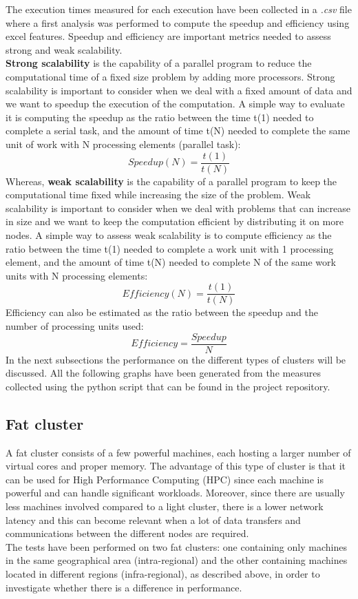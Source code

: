 \documentclass[final,5p,times,twocolumn,authoryear]{elsarticle}
\begin{document}
The execution times measured for each execution have been collected in a \emph{.csv} file where a first analysis was performed to compute the speedup and efficiency using excel features. Speedup and efficiency are important metrics needed to assess strong and weak scalability. \\
\textbf{Strong scalability} is the capability of a parallel program to reduce the computational time of a fixed size problem by adding more processors. Strong scalability is important to consider when we deal with a fixed amount of data and we want to speedup the execution of the computation. A simple way to evaluate it is computing the speedup as the ratio between the time t(1) needed to complete a serial task, and the amount of time t(N) needed to complete the same unit of work with N processing elements (parallel task)\cite{hpc scaling}:
$$ Speedup(N) = \frac{t(1)}{t(N)} $$
Whereas, \textbf{weak scalability} is the capability of a parallel program to keep the computational time fixed while increasing the size of the problem. Weak scalability is important to consider when we deal with problems that can increase in size and we want to keep the computation efficient by distributing it on more nodes. A simple way to assess weak scalability is to compute efficiency as the ratio between the time t(1) needed to complete a work unit with 1 processing element, and the amount of time t(N) needed to complete N of the same work units with N processing elements\cite{hpc scaling}:
$$ Efficiency(N) = \frac{t(1)}{t(N)} $$
Efficiency can also be estimated as the ratio between the speedup and the number of processing units used:
$$ Efficiency = \frac{Speedup}{N} $$
In the next subsections the performance on the different types of clusters will be discussed. All the following graphs have been generated from the measures collected using the python script that can be found in the project repository\cite{analysis me}.

\subsection{Fat cluster}
A fat cluster consists of a few powerful machines, each hosting a larger number of virtual cores and proper memory. The advantage of this type of cluster is that it can be used for High Performance Computing (HPC) since each machine is powerful and can handle significant workloads. Moreover, since there are usually less machines involved compared to a light cluster, there is a lower network latency and this can become relevant when a lot of data transfers and communications between the different nodes are required.\\
The tests have been performed on two fat clusters: one containing only machines in the same geographical area (intra-regional) and the other containing machines located in different regions (infra-regional), as described above, in order to investigate whether there is a difference in performance.
\end{document}

